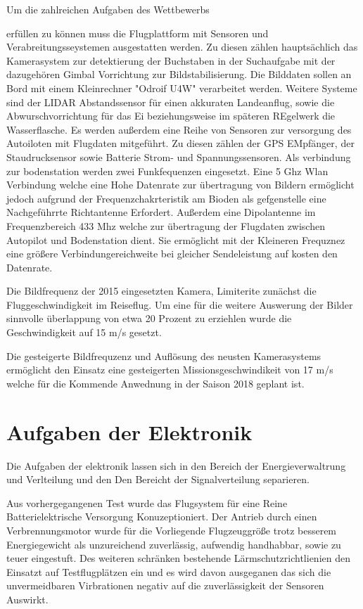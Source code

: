 Um die zahlreichen Aufgaben des Wettbewerbs \begin{comment} Verweis auf Wettbewerbsaufben \end{comment}
erfüllen zu können muss die Flugplattform mit Sensoren und Verabreitungsseystemen ausgestatten werden.
Zu diesen zählen hauptsächlich das Kamerasystem zur detektierung der Buchstaben in der Suchaufgabe mit der dazugehören
Gimbal Vorrichtung zur Bildstabilisierung. Die Bilddaten sollen an Bord mit einem Kleinrechner "Odroif U4W" verarbeitet werden. Weitere Systeme sind der LIDAR Abstandssensor für einen akkuraten Landeanflug, sowie die Abwurschvorrichtung für das Ei beziehungsweise im späteren REgelwerk die Wasserflasche.
Es werden außerdem eine Reihe von Sensoren zur versorgung des Autoiloten mit Flugdaten mitgeführt. Zu diesen zählen der GPS EMpfänger, der Staudrucksensor sowie Batterie Strom- und Spannungssensoren.
Als verbindung zur bodenstation werden zwei Funkfequenzen eingesetzt.
Eine 5 Ghz Wlan Verbindung welche eine Hohe Datenrate zur übertragung von Bildern  ermöglicht jedoch aufgrund der Frequenzchakrteristik am Bioden als gefgenstelle eine Nachgeführrte Richtantenne Erfordert.
Außerdem eine Dipolantenne im Frequenzbereich 433 Mhz welche zur übertragung der Flugdaten zwischen Autopilot und Bodenstation dient. Sie ermöglicht mit der Kleineren Frequznez eine größere Verbindungereichweite bei gleicher Sendeleistung auf kosten den Datenrate.

Die Bildfrequenz der 2015 eingesetzten Kamera, Limiterite zunächst die Fluggeschwindigkeit im Reiseflug. Um eine für die weitere Auswerung der Bilder sinnvolle überlappung von etwa 20 Prozent zu erziehlen wurde die Geschwindigkeit auf 15 m/s gesetzt.

Die gesteigerte Bildfrequzenz und Auflösung des neusten Kamerasystems ermöglicht den Einsatz eine gesteigerten Missionsgeschwindikeit von 17 m/s welche für die Kommende Anwednung in der Saison 2018 geplant ist.

\section{Aufgaben der Elektronik}

Die Aufgaben der elektronik lassen sich in den Bereich der Energieverwaltrung und Verlteilung  und den Den Bereicht der Signalverteilung separieren.

Aus vorhergegangenen Test wurde das Flugsystem für eine Reine Batterielektrische Versorgung Konuzeptioniert.
Der Antrieb durch einen Verbrennungsmotor wurde für die Vorliegende Flugzeuggröße trotz besserem Energiegewicht als unzureichend zuverlässig, aufwendig handhabbar, sowie zu teuer eingestuft.
Des weiteren schränken bestehende Lärmschutzrichtlienien den Einsatzt auf Testflugplätzen ein und es wird davon ausgeganen das sich die unvermeidbaren Virbrationen negativ auf die zuverlässigkeit der Sensoren Auswirkt.

